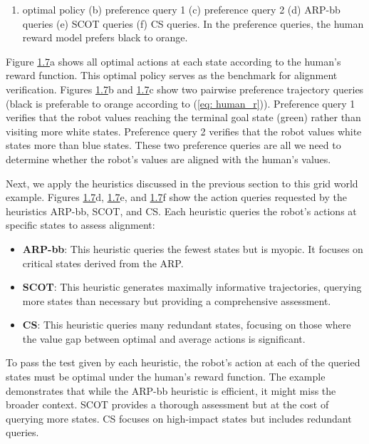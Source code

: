 \documentclass[
  letterpaper,
  DIV=11,
  numbers=noendperiod,
  oneside]{scrreprt}
\providecommand{\tightlist}{%
  \setlength{\itemsep}{0pt}\setlength{\parskip}{0pt}}\usepackage{longtable,booktabs,array}
\theoremstyle{remark}
\begin{document}
\label{fig:island}{}

\begin{enumerate}
\def\labelenumi{(\alph{enumi})}
\tightlist
\item
  optimal policy (b) preference query 1 (c) preference query 2 (d)
  ARP-bb queries (e) SCOT queries (f) CS queries. In the preference
  queries, the human reward model prefers black to orange.
\end{enumerate}

Figure \hyperref[fig:island]{1.7}a shows all optimal actions at each
state according to the human's reward function. This optimal policy
serves as the benchmark for alignment verification. Figures
\hyperref[fig:island]{1.7}b and \hyperref[fig:island]{1.7}c show two
pairwise preference trajectory queries (black is preferable to orange
according to (\hyperref[eq:ux5cux2520human_r]{{[}eq: human\_r{]}})).
Preference query 1 verifies that the robot values reaching the terminal
goal state (green) rather than visiting more white states. Preference
query 2 verifies that the robot values white states more than blue
states. These two preference queries are all we need to determine
whether the robot's values are aligned with the human's values.

Next, we apply the heuristics discussed in the previous section to this
grid world example. Figures \hyperref[fig:island]{1.7}d,
\hyperref[fig:island]{1.7}e, and \hyperref[fig:island]{1.7}f show the
action queries requested by the heuristics ARP-bb, SCOT, and CS. Each
heuristic queries the robot's actions at specific states to assess
alignment:

\begin{itemize}
\item
  \textbf{ARP-bb}: This heuristic queries the fewest states but is
  myopic. It focuses on critical states derived from the ARP.
\item
  \textbf{SCOT}: This heuristic generates maximally informative
  trajectories, querying more states than necessary but providing a
  comprehensive assessment.
\item
  \textbf{CS}: This heuristic queries many redundant states, focusing on
  those where the value gap between optimal and average actions is
  significant.
\end{itemize}

To pass the test given by each heuristic, the robot's action at each of
the queried states must be optimal under the human's reward function.
The example demonstrates that while the ARP-bb heuristic is efficient,
it might miss the broader context. SCOT provides a thorough assessment
but at the cost of querying more states. CS focuses on high-impact
states but includes redundant queries.
\end{document}
